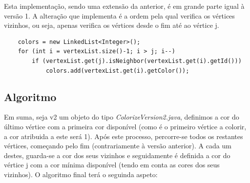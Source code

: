 \documentclass[a4paper,12pt]{report}
\begin{document}
Esta implementação, sendo uma extensão da anterior, é em grande parte igual à versão 1. A alteração que implementa é a ordem pela qual verifica os vértices vizinhos, ou seja, apenas verifica os vértices desde o fim até ao vértice j.

\begin{lstlisting}
    colors = new LinkedList<Integer>();
    for (int i = vertexList.size()-1; i > j; i--)
        if (vertexList.get(j).isNeighbor(vertexList.get(i).getId()))
            colors.add(vertexList.get(i).getColor());
\end{lstlisting}

\subsection*{Algoritmo}

Em suma, seja v2 um objeto do tipo \textit{ColorizeVersion2.java}, definimos a cor do último vértice com a primeira cor disponível (como é o primeiro vértice a colorir, a cor atribuida a este será 1).
Após este processo, percorre-se todos os restantes vértices, começando pelo fim (contrariamente à versão anterior). A cada um destes, guarda-se a cor dos seus vizinhos e seguidamente é definida a cor do vértice j com a cor mínima disponível (tendo em conta as cores dos seus vizinhos).
O algoritmo final terá o seguinda aspeto:
\end{document}
